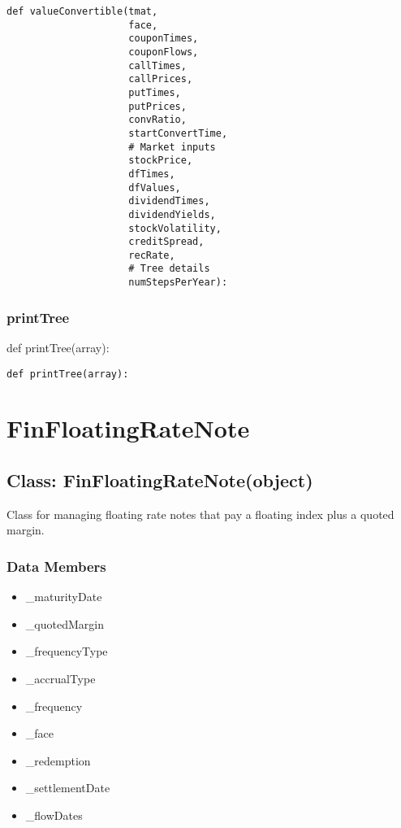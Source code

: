 \documentclass[twoside,11pt]{book}
\begin{document}
\begin{lstlisting}
def valueConvertible(tmat,
                     face,
                     couponTimes,
                     couponFlows,
                     callTimes,
                     callPrices,
                     putTimes,
                     putPrices,
                     convRatio,
                     startConvertTime,
                     # Market inputs
                     stockPrice,
                     dfTimes,
                     dfValues,
                     dividendTimes,
                     dividendYields,
                     stockVolatility,
                     creditSpread,
                     recRate,
                     # Tree details
                     numStepsPerYear):
\end{lstlisting}

\subsubsection*{{\bf printTree}}
def printTree(array): 

\begin{lstlisting}
def printTree(array):
\end{lstlisting}

\newpage
\section{FinFloatingRateNote}

\subsection*{Class: FinFloatingRateNote(object)}
Class for managing floating rate notes that pay a floating index plus a quoted margin. 

\subsubsection*{Data Members}
\begin{itemize}
\item{\_maturityDate}
\item{\_quotedMargin}
\item{\_frequencyType}
\item{\_accrualType}
\item{\_frequency}
\item{\_face}
\item{\_redemption}
\item{\_settlementDate}
\item{\_flowDates}
\end{itemize}
\end{document}
